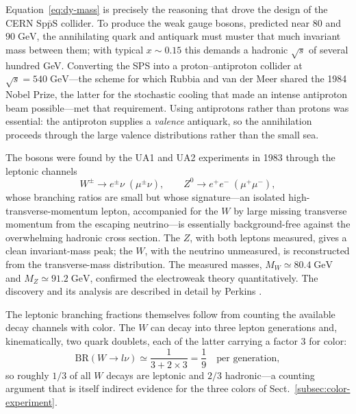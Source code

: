 Equation~\eqref{eq:dy-mass} is precisely the reasoning that drove the design of the
CERN $\mathrm{Sp\bar pS}$ collider. To produce the weak gauge bosons, predicted near
$80$ and $90\;\mathrm{GeV}$, the annihilating quark and antiquark must muster that much
invariant mass between them; with typical $x \sim 0.15$ this demands a hadronic
$\sqrt{s}$ of several hundred GeV. Converting the SPS into a proton--antiproton collider
at $\sqrt{s} = 540\;\mathrm{GeV}$---the scheme for which Rubbia and van der Meer shared
the 1984 Nobel Prize, the latter for the stochastic cooling that made an intense
antiproton beam possible---met that requirement. Using antiprotons rather than protons
was essential: the antiproton supplies a \emph{valence} antiquark, so the annihilation
proceeds through the large valence distributions rather than the small sea.

The bosons were found by the UA1 and UA2 experiments in 1983 through the leptonic
channels
\begin{equation}
    W^{\pm} \to e^{\pm}\nu\;(\mu^{\pm}\nu),
    \qquad
    Z^{0} \to e^{+}e^{-}\;(\mu^{+}\mu^{-}),
    \label{eq:wz-channels}
\end{equation}
whose branching ratios are small but whose signature---an isolated high-transverse-momentum
lepton, accompanied for the $W$ by large missing transverse momentum from the escaping
neutrino---is essentially background-free against the overwhelming hadronic cross section.
The $Z$, with both leptons measured, gives a clean invariant-mass peak; the $W$, with the
neutrino unmeasured, is reconstructed from the transverse-mass distribution. The measured
masses, $M_{W} \simeq 80.4\;\mathrm{GeV}$ and $M_{Z} \simeq 91.2\;\mathrm{GeV}$,
confirmed the electroweak theory quantitatively. The discovery and its analysis are
described in detail by Perkins \cite[Ch.~7]{Perkins2000}.

The leptonic branching fractions themselves follow from counting the available decay
channels with color. The $W$ can decay into three lepton generations and, kinematically,
two quark doublets, each of the latter carrying a factor $3$ for color:
\begin{equation}
    \mathrm{BR}(W\to l\nu) \simeq \frac{1}{3 + 2\times 3} = \frac{1}{9}
    \quad\text{per generation},
    \label{eq:w-branching}
\end{equation}
so roughly $1/3$ of all $W$ decays are leptonic and $2/3$ hadronic---a counting argument
that is itself indirect evidence for the three colors of
Sect.~\ref{subsec:color-experiment}.

